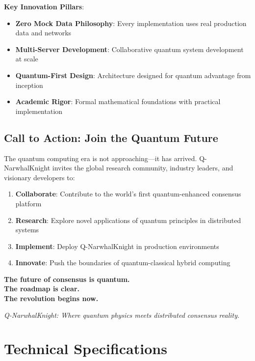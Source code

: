 \documentclass[11pt,a4paper]{article}
\begin{document}
\textbf{Key Innovation Pillars}:
\begin{itemize}
\item \textbf{Zero Mock Data Philosophy}: Every implementation uses real production data and networks
\item \textbf{Multi-Server Development}: Collaborative quantum system development at scale  
\item \textbf{Quantum-First Design}: Architecture designed for quantum advantage from inception
\item \textbf{Academic Rigor}: Formal mathematical foundations with practical implementation
\end{itemize}

\subsection{Call to Action: Join the Quantum Future}

The quantum computing era is not approaching—it has arrived. Q-NarwhalKnight invites the global research community, industry leaders, and visionary developers to:

\begin{enumerate}
\item \textbf{Collaborate}: Contribute to the world's first quantum-enhanced consensus platform
\item \textbf{Research}: Explore novel applications of quantum principles in distributed systems
\item \textbf{Implement}: Deploy Q-NarwhalKnight in production environments
\item \textbf{Innovate}: Push the boundaries of quantum-classical hybrid computing
\end{enumerate}

\vspace{1cm}
\begin{tcolorbox}[colback=quantumblue!10!white,colframe=quantumblue!75!black]
\centering
\Large\textbf{The future of consensus is quantum.}\\
\Large\textbf{The roadmap is clear.}\\
\Large\textbf{The revolution begins now.}

\vspace{0.5cm}
\textit{Q-NarwhalKnight: Where quantum physics meets distributed consensus reality.}
\end{tcolorbox}

\newpage
\appendix

\section{Technical Specifications}
\end{document}
